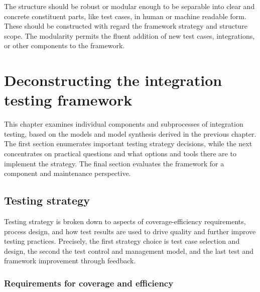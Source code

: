 \documentclass[12pt,a4paper,oneside,pdftex]{report}
\begin{document}
The structure should be robust or modular enough to be separable into clear and concrete constituent parts, like test cases, in human or machine readable form. These should be constructed with regard the framework strategy and structure scope. The modularity permits the fluent addition of new test cases, integrations, or other components to the framework.

\begin{comment}
The testing process can vary in its mode of execution or degree of automation. In what is perhaps the most extreme case, test case are run automatically every time a change is committed to system source code. This approach is called continuous integration (CI). 
\end{comment}


\chapter{Deconstructing the integration testing framework}
\label{chapter:frameworkanalysis}

This chapter examines individual components and subprocesses of integration testing, based on the models and model synthesis derived in the previous chapter. The first section enumerates important testing strategy decisions, while the next concentrates on practical questions and what options and tools there are to implement the strategy. The final section evaluates the framework for a component and maintenance perspective.

\section{Testing strategy}

Testing strategy is broken down to aspects of coverage-efficiency requirements, process design, and how test results are used to drive quality and further improve testing practices. Precisely, the first strategy choice is test case selection and design, the second the test control and management model, and the last test and framework improvement through feedback. %

\subsection{Requirements for coverage and efficiency}
\end{document}
